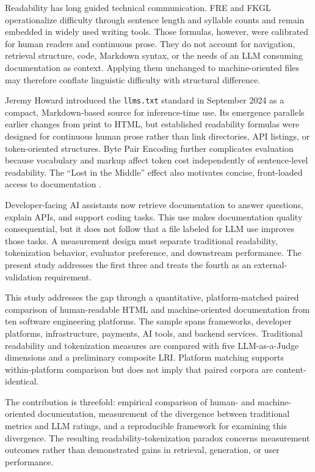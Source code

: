 \documentclass[10pt,conference,a4paper]{IEEEtran}
\begin{document}
Readability has long guided technical communication. FRE and FKGL operationalize difficulty through sentence length and syllable counts and remain embedded in widely used writing tools. Those formulas, however, were calibrated for human readers and continuous prose. They do not account for navigation, retrieval structure, code, Markdown syntax, or the needs of an LLM consuming documentation as context. Applying them unchanged to machine-oriented files may therefore conflate linguistic difficulty with structural difference.

Jeremy Howard introduced the \texttt{llms.txt} standard in September 2024 as a compact, Markdown-based source for inference-time use. Its emergence parallels earlier changes from print to HTML, but established readability formulas were designed for continuous human prose rather than link directories, API listings, or token-oriented structures. Byte Pair Encoding further complicates evaluation because vocabulary and markup affect token cost independently of sentence-level readability. The ``Lost in the Middle'' effect also motivates concise, front-loaded access to documentation \cite{Liu2023}.

Developer-facing AI assistants now retrieve documentation to answer questions, explain APIs, and support coding tasks. This use makes documentation quality consequential, but it does not follow that a file labeled for LLM use improves those tasks. A measurement design must separate traditional readability, tokenization behavior, evaluator preference, and downstream performance. The present study addresses the first three and treats the fourth as an external-validation requirement.

This study addresses the gap through a quantitative, platform-matched paired comparison of human-readable HTML and machine-oriented documentation from ten software engineering platforms. The sample spans frameworks, developer platforms, infrastructure, payments, AI tools, and backend services. Traditional readability and tokenization measures are compared with five LLM-as-a-Judge dimensions and a preliminary composite LRI. Platform matching supports within-platform comparison but does not imply that paired corpora are content-identical.

The contribution is threefold: empirical comparison of human- and machine-oriented documentation, measurement of the divergence between traditional metrics and LLM ratings, and a reproducible framework for examining this divergence. The resulting readability-tokenization paradox concerns measurement outcomes rather than demonstrated gains in retrieval, generation, or user performance.
\end{document}
